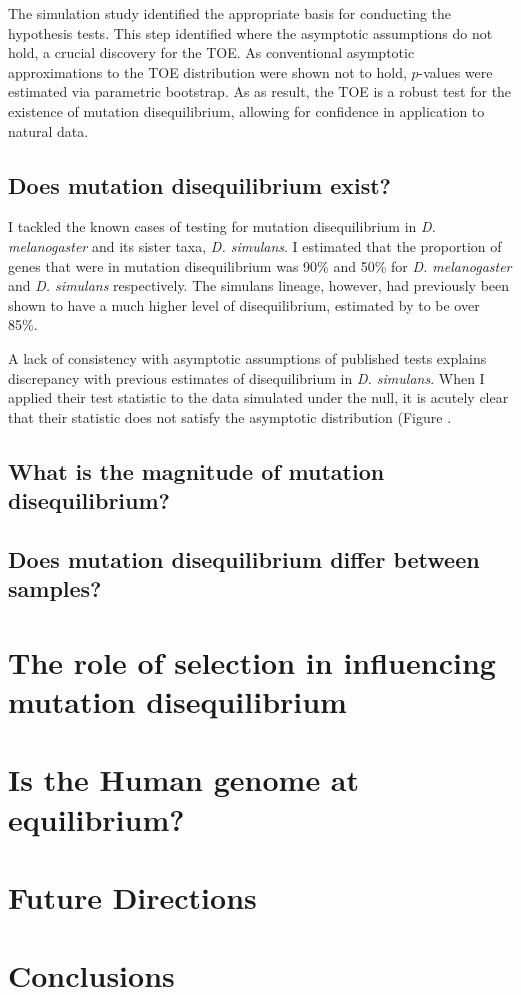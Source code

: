 The simulation study identified the appropriate basis for conducting the hypothesis tests. This step identified where the asymptotic assumptions do not hold, a crucial discovery for the TOE. As conventional asymptotic approximations to the TOE distribution were shown not to hold, $p$-values were estimated via parametric bootstrap. As as result, the TOE is a robust test for the existence of mutation disequilibrium, allowing for confidence in application to natural data. 

\subsection{Does mutation disequilibrium exist?}

I tackled the known cases of testing for mutation disequilibrium in \textit{D. melanogaster} and its sister taxa, \textit{D. simulans}. I estimated that the proportion of genes that were in mutation disequilibrium was 90\% and 50\% for \textit{D. melanogaster} and \textit{D. simulans} respectively.  The simulans lineage, however, had previously been shown to have a much higher level of disequilibrium, estimated by \cite{Squartini2008QuantifyingProcess} to be over 85\%. 

A lack of consistency with asymptotic assumptions of published tests explains discrepancy with previous estimates of disequilibrium in \textit{D. simulans}. When I applied their test statistic to the data simulated under the null, it is acutely clear that their statistic does not satisfy the asymptotic distribution (Figure . 

\subsection{What is the magnitude of mutation disequilibrium?}

\subsection{Does mutation disequilibrium differ between samples?}

\section{The role of selection in influencing mutation disequilibrium}

\section{Is the Human genome at equilibrium?}

\section{Future Directions}

\section{Conclusions}